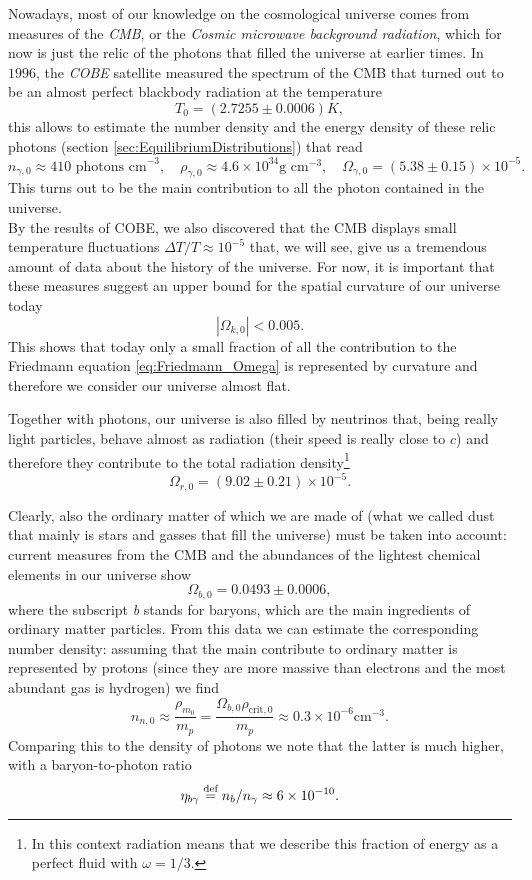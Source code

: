 Nowadays, most of our knowledge on the cosmological universe comes from measures of the \emph{CMB}, or the \emph{Cosmic microwave background radiation}, which for now is just the relic of the photons that filled the universe at earlier times. In $1996$, the \emph{COBE} satellite \cite{COBE1996} measured the spectrum of the CMB that turned out to be an almost perfect blackbody radiation at the temperature 
\begin{equation}
    \label{eq:T0_CMB}
    T_0=(2.7255\pm0.0006)K,
\end{equation}
this allows to estimate the number density and the energy density of these relic photons (section \ref{sec:EquilibriumDistributions}) that read
$$n_{\gamma,0}\approx410\text{ photons cm}^{-3},\quad \rho_{\gamma, 0}\approx4.6\times10^{34}\text{g cm}^{-3},\quad\Omega_{\gamma,0}=(5.38\pm0.15)\times10^{-5}.$$
This turns out to be the main contribution to all the photon contained in the universe.\\
By the results of COBE, we also discovered that the CMB displays small temperature fluctuations $\Delta T/T\approx 10^{-5}$ that, we will see, give us a tremendous amount of data about the history of the universe. For now, it is important that these measures suggest an upper bound for the spatial curvature of our universe today
\begin{equation}
    \label{eq:Omega_k0}|\Omega_{k,0}|<0.005.
\end{equation}
This shows that today only a small fraction of all the contribution to the Friedmann equation \eqref{eq:Friedmann_Omega} is represented by curvature and therefore we consider our universe almost flat. 

Together with photons, our universe is also filled by neutrinos that, being really light particles, behave almost as radiation (their speed is really close to $c$) and therefore they contribute to the total radiation density\footnote{In this context radiation means that we describe this fraction of energy as a perfect fluid with $\omega=1/3$.} $$\Omega_{r,0}=(9.02\pm0.21)\times10^{-5}.$$  

Clearly, also the ordinary matter of which we are made of (what we called dust that mainly is stars and gasses that fill the universe) must be taken into account: current measures from the CMB and the abundances of the lightest chemical elements in our universe show $$\Omega_{b,0}=0.0493\pm0.0006,$$
where the subscript \emph{b} stands for baryons, which are the main ingredients of ordinary matter particles.
From this data we can estimate the corresponding number density: assuming that the main contribute to ordinary matter is represented by protons (since they are more massive than electrons and the most abundant gas is hydrogen) we find $$n_{n,0}\approx\frac{\rho_{m_0}}{m_p}=\frac{\Omega_{b,0}\rho_{\text{crit},0}}{m_p}\approx0.3\times10^{-6}\text{cm}^{-3}.$$ Comparing this to the density of photons we note that the latter is much higher, with a baryon-to-photon ratio
\begin{equation}
    \label{eq:baryon-to.photon_ratio}
    \eta_{b\gamma}\stackrel{\text{def}}{=} n_b/n_\gamma\approx6\times10^{-10}.
\end{equation}

